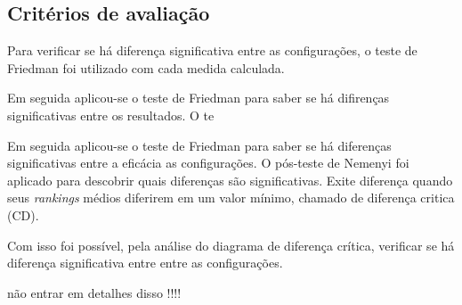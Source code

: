 \subsection{Critérios de avaliação}


Para verificar se há diferença significativa entre as configurações, o teste de Friedman foi utilizado com cada medida calculada. 





Em seguida aplicou-se o teste de Friedman para saber se há difirenças significativas entre os resultados. O te

Em seguida aplicou-se o teste de Friedman para saber se há diferenças significativas entre a eficácia as configurações. O pós-teste de Nemenyi foi aplicado para descobrir quais diferenças são significativas. 
%
Exite diferença quando seus \textit{rankings} médios diferirem em um valor mínimo, chamado de diferença critica (CD). 
%

Com isso foi possível, pela análise do diagrama de diferença crítica, verificar 
se há diferença significativa entre entre as configurações.


%




	
	não entrar em detalhes disso !!!!









